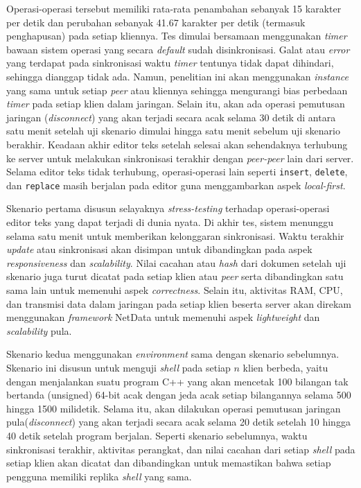 Operasi-operasi tersebut memiliki rata-rata penambahan sebanyak 15 karakter per detik dan perubahan sebanyak 41.67 karakter per detik (termasuk penghapusan) pada setiap kliennya. Tes dimulai bersamaan menggunakan \textit{timer} bawaan sistem operasi yang secara \textit{default} sudah disinkronisasi. Galat atau \textit{error} yang terdapat pada sinkronisasi waktu \textit{timer} tentunya tidak dapat dihindari, sehingga dianggap tidak ada. Namun, penelitian ini akan menggunakan \textit{instance} yang sama untuk setiap \textit{peer} atau kliennya sehingga mengurangi bias perbedaan \textit{timer} pada setiap klien dalam jaringan. Selain itu, akan ada operasi pemutusan jaringan (\textit{disconnect}) yang akan terjadi secara acak selama 30 detik di antara satu menit setelah uji skenario dimulai hingga satu menit sebelum uji skenario berakhir. Keadaan akhir editor teks setelah selesai akan sehendaknya terhubung ke server untuk melakukan sinkronisasi terakhir dengan \textit{peer-peer} lain dari server. Selama editor teks tidak terhubung, operasi-operasi lain seperti \texttt{insert}, \texttt{delete}, dan \texttt{replace} masih berjalan pada editor guna menggambarkan aspek \textit{local-first}.

Skenario pertama disusun selayaknya \textit{stress-testing} terhadap operasi-operasi editor teks yang dapat terjadi di dunia nyata. Di akhir tes, sistem menunggu selama satu menit untuk memberikan kelonggaran sinkronisasi. Waktu terakhir \textit{update} atau sinkronisasi akan disimpan untuk dibandingkan pada aspek \textit{responsiveness} dan \textit{scalability}. Nilai cacahan atau \textit{hash} dari dokumen setelah uji skenario juga turut dicatat pada setiap klien atau \textit{peer} serta dibandingkan satu sama lain untuk memenuhi aspek \textit{correctness}. Selain itu, aktivitas RAM, CPU, dan transmisi data dalam jaringan pada setiap klien beserta server akan direkam menggunakan \textit{framework} NetData untuk memenuhi aspek \textit{lightweight} dan \textit{scalability} pula.

Skenario kedua menggunakan \textit{environment} sama dengan skenario sebelumnya. Skenario ini disusun untuk menguji \textit{shell} pada setiap $n$ klien berbeda, yaitu dengan menjalankan suatu program C++ yang akan mencetak 100 bilangan tak bertanda (unsigned) 64-bit acak dengan jeda acak setiap bilangannya selama 500 hingga 1500 milidetik. Selama itu, akan dilakukan operasi pemutusan jaringan pula(\textit{disconnect}) yang akan terjadi secara acak selama 20 detik setelah 10 hingga 40 detik setelah program berjalan. Seperti skenario sebelumnya, waktu sinkronisasi terakhir, aktivitas perangkat, dan nilai cacahan dari setiap \textit{shell} pada setiap klien akan dicatat dan dibandingkan untuk memastikan bahwa setiap pengguna memiliki replika \textit{shell} yang sama.

